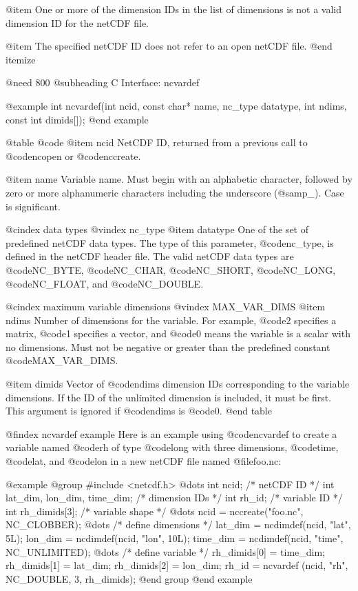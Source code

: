 @item
One or more of the dimension IDs in the list of dimensions is not a
valid dimension ID for the netCDF file.

@item
The specified netCDF ID does not refer to an open netCDF file.
@end itemize

@need 800
@subheading C Interface:  ncvardef

@example
int ncvardef(int ncid, const char* name, nc_type datatype,
             int ndims, const int dimids[]);
@end example

@table @code
@item ncid
NetCDF ID, returned from a previous call to @code{ncopen} or @code{nccreate}.

@item name
Variable name.  Must begin with an alphabetic character, followed by
zero or more alphanumeric characters including the underscore (@samp{_}).  Case is
significant.

@cindex data types
@vindex nc_type
@item datatype
One of the set of predefined netCDF data types.  The type of this
parameter, @code{nc_type}, is defined in the netCDF header file.  The
valid netCDF data types are @code{NC_BYTE}, @code{NC_CHAR},
@code{NC_SHORT}, @code{NC_LONG}, @code{NC_FLOAT}, and @code{NC_DOUBLE}.

@cindex maximum variable dimensions
@vindex MAX_VAR_DIMS
@item ndims
Number of dimensions for the variable.  For example, @code{2} specifies
a matrix, @code{1} specifies a vector, and @code{0} means the variable
is a scalar with no dimensions.  Must not be negative or greater than
the predefined constant @code{MAX_VAR_DIMS}.

@item dimids
Vector of @code{ndims} dimension IDs corresponding to the variable
dimensions.
If the ID of the unlimited dimension is included, it
must be first.
This argument is ignored if @code{ndims} is @code{0}.
@end table

@findex ncvardef example
Here is an example using @code{ncvardef} to create a variable named
@code{rh} of type @code{long} with three dimensions, @code{time},
@code{lat}, and @code{lon} in a new netCDF file named @file{foo.nc}:

@example
@group
#include <netcdf.h>
   @dots{}
int  ncid;                         /* netCDF ID */
int  lat_dim, lon_dim, time_dim;   /* dimension IDs */
int  rh_id;                        /* variable ID */
int  rh_dimids[3];                 /* variable shape */
   @dots{}
ncid = nccreate("foo.nc", NC_CLOBBER);
   @dots{}
                                   /* define dimensions */
lat_dim = ncdimdef(ncid, "lat", 5L);
lon_dim = ncdimdef(ncid, "lon", 10L);
time_dim = ncdimdef(ncid, "time", NC_UNLIMITED);
   @dots{}
                                  /* define variable */
rh_dimids[0] = time_dim;
rh_dimids[1] = lat_dim;
rh_dimids[2] = lon_dim;
rh_id = ncvardef (ncid, "rh", NC_DOUBLE, 3, rh_dimids);
@end group
@end example

